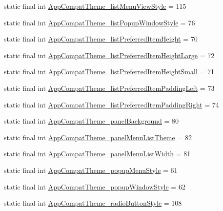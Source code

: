 \begin{CompactItemize}
\item 
static final int \hyperlink{classandroid_1_1support_1_1v4_1_1_r_1_1styleable_1b00f2d6ba69378b7ec0cfccf25c0f46}{AppCompatTheme\_\-listMenuViewStyle} = 115
\item 
static final int \hyperlink{classandroid_1_1support_1_1v4_1_1_r_1_1styleable_bd2ee13ff17345e9f5fe98bc84202b71}{AppCompatTheme\_\-listPopupWindowStyle} = 76
\item 
static final int \hyperlink{classandroid_1_1support_1_1v4_1_1_r_1_1styleable_54d99bb5430cafe306a647e9b8c23557}{AppCompatTheme\_\-listPreferredItemHeight} = 70
\item 
static final int \hyperlink{classandroid_1_1support_1_1v4_1_1_r_1_1styleable_8e939e05300583b0aef1b0e9e345f506}{AppCompatTheme\_\-listPreferredItemHeightLarge} = 72
\item 
static final int \hyperlink{classandroid_1_1support_1_1v4_1_1_r_1_1styleable_fee8f8be3df435711c5bb0d3b5eb1bdd}{AppCompatTheme\_\-listPreferredItemHeightSmall} = 71
\item 
static final int \hyperlink{classandroid_1_1support_1_1v4_1_1_r_1_1styleable_9cce233669ccd45e691fcd5ebd0a293a}{AppCompatTheme\_\-listPreferredItemPaddingLeft} = 73
\item 
static final int \hyperlink{classandroid_1_1support_1_1v4_1_1_r_1_1styleable_265ab9cd877ed88fe04ba61fc41703e3}{AppCompatTheme\_\-listPreferredItemPaddingRight} = 74
\item 
static final int \hyperlink{classandroid_1_1support_1_1v4_1_1_r_1_1styleable_1423cc9159dec9dd298b6391ef1df328}{AppCompatTheme\_\-panelBackground} = 80
\item 
static final int \hyperlink{classandroid_1_1support_1_1v4_1_1_r_1_1styleable_8e2495f71c94aa2c96f2965980b2f309}{AppCompatTheme\_\-panelMenuListTheme} = 82
\item 
static final int \hyperlink{classandroid_1_1support_1_1v4_1_1_r_1_1styleable_5eae8eccd5625c8acb9a2d0522e7fd35}{AppCompatTheme\_\-panelMenuListWidth} = 81
\item 
static final int \hyperlink{classandroid_1_1support_1_1v4_1_1_r_1_1styleable_833514c9937294d571844e13b7a70786}{AppCompatTheme\_\-popupMenuStyle} = 61
\item 
static final int \hyperlink{classandroid_1_1support_1_1v4_1_1_r_1_1styleable_7b4761ddad1866b99166d9027b1a91de}{AppCompatTheme\_\-popupWindowStyle} = 62
\item 
static final int \hyperlink{classandroid_1_1support_1_1v4_1_1_r_1_1styleable_530d6e3b48153addedc781558453a828}{AppCompatTheme\_\-radioButtonStyle} = 108

\end{CompactItemize}

